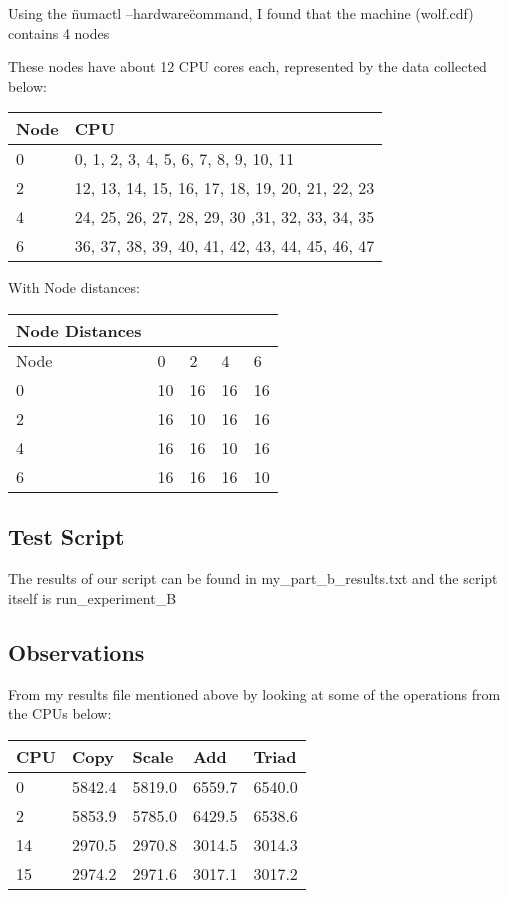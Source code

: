 \documentclass{article}
\begin{document}
Using the \"numactl --hardware\" command, I found that the machine (wolf.cdf) contains 4 nodes 

These nodes have about 12 CPU cores each, represented by the data collected below:

\begin{center}
\begin{tabular}{|l|l|}
  \hline
  Node & CPU \\ \hline
  0 & 0, 1, 2, 3, 4, 5, 6, 7, 8, 9, 10, 11 \\ \hline
  2 & 12, 13, 14, 15, 16, 17, 18, 19, 20, 21, 22, 23 \\ \hline
  4 & 24, 25, 26, 27, 28, 29, 30 ,31, 32, 33, 34, 35 \\ \hline
  6 & 36, 37, 38, 39, 40, 41, 42, 43, 44, 45, 46, 47 \\ \hline
\end{tabular}
\end{center}

With Node distances:

\begin{center}
\begin{tabular}{|l|l|l|l|l|}
	\hline
	Node Distances \\ \hline
	Node & 0 & 2 & 4 & 6 \\ \hline
  	0 & 10 & 16 & 16 & 16 \\ \hline
  	2 & 16 & 10 & 16 & 16 \\ \hline
  	4 & 16 & 16 & 10 & 16 \\ \hline
  	6 & 16 & 16 & 16 & 10 \\ \hline

\end{tabular}
\end{center}



\subsection{Test Script}

The results of our script can be found in my\_part\_b\_results.txt and the script itself is run\_experiment\_B

\subsection{Observations}

From my results file mentioned above by looking at some of the operations from the CPUs below:

\begin{center}
\begin{tabular}{|l|l|l|l|l|}
	\hline 
	CPU & Copy & Scale & Add & Triad \\ \hline
	0 & 5842.4 & 5819.0 & 6559.7 & 6540.0 \\ \hline
	2 & 5853.9 & 5785.0 & 6429.5 & 6538.6 \\ \hline
	14 & 2970.5 & 2970.8 & 3014.5 & 3014.3 \\ \hline
	15 & 2974.2 & 2971.6 & 3017.1 & 3017.2 \\ \hline
\end{tabular}
\end{center}
\end{document}
